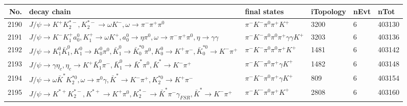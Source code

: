 \begin{table}[htbp] 
\begin{center}
\begin{small}
\begin{tabular}{rlllll}\hline\hline
 No. & decay chain & final states &  iTopology & nEvt & nTot \\\hline
2190&$J/\psi       \rightarrow K^{+}          K_2^{*-}       , K_2^{*-}        \rightarrow \omega         K^{-}          , \omega          \rightarrow \pi^{-}        \pi^{+}        \pi^{0}        $&$\pi^{-}        K^{-}          \pi^{0}        \pi^{+}        K^{+}          $& 3200&    6&403130\\
2191&$J/\psi       \rightarrow K^{-}          K_1^{+}        a_{0}^{0}      , K_1^{+}         \rightarrow \omega         K^{+}          , a_{0}^{0}       \rightarrow \eta          \pi^{0}        , \omega          \rightarrow \pi^{-}        \pi^{+}        \pi^{0}        , \eta           \rightarrow \gamma       \gamma       $&$\pi^{-}        K^{-}          \pi^{0}        \pi^{0}        \pi^{+}        \gamma       \gamma       K^{+}          $& 3203&    6&403136\\
2192&$J/\psi       \rightarrow K_1^{0}        \bar{K}_1^{0} , K_1^{0}         \rightarrow K_0^{0}        \pi^{0}        , \bar{K}_1^{0}  \rightarrow \bar{K}_0^{*0}\pi^{0}        , K_0^{0}         \rightarrow K^{+}          \pi^{-}        , \bar{K}_0^{*0} \rightarrow K^{-}          \pi^{+}        $&$\pi^{-}        K^{-}          \pi^{0}        \pi^{0}        \pi^{+}        K^{+}          $& 1481&    6&403142\\
2193&$J/\psi       \rightarrow \gamma       \eta_{c}    , \eta_{c}     \rightarrow K^{+}          \bar{K}_1^{0} \pi^{-}        , \bar{K}_1^{0}  \rightarrow \bar{K}^{*}   \pi^{0}        , \bar{K}^{*}    \rightarrow K^{-}          \pi^{+}        $&$\pi^{-}        K^{-}          \pi^{0}        \pi^{+}        \gamma       K^{+}          $& 1482&    6&403148\\
2194&$J/\psi       \rightarrow \omega         \bar{K}^{*}   K_2^{*0}       , \omega          \rightarrow \pi^{0}        \gamma       , \bar{K}^{*}    \rightarrow K^{-}          \pi^{+}        , K_2^{*0}        \rightarrow K^{+}          \pi^{-}        $&$\pi^{-}        K^{-}          \pi^{0}        \pi^{+}        \gamma       K^{+}          $&  809&    6&403154\\
2195&$J/\psi       \rightarrow K^{*+}         K_2^{*-}       , K^{*+}          \rightarrow K^{+}          \pi^{0}        , K_2^{*-}        \rightarrow \bar{K}^{*}   \pi^{-}        \gamma_{FSR} , \bar{K}^{*}    \rightarrow K^{-}          \pi^{+}        $&$\pi^{-}        K^{-}          \pi^{0}        \pi^{+}        K^{+}          $& 2808&    6&403160\\

\end{tabular}
\end{small}
\end{center}
\end{table}

